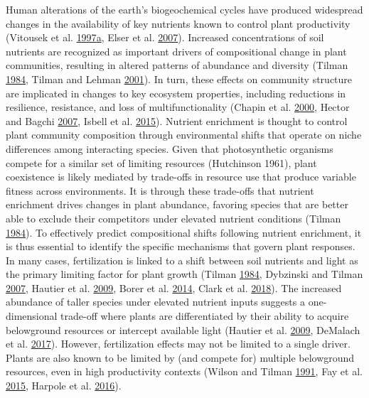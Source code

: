 \documentclass[twoside,12pt,final]{ucthesis-CA2012}
\begin{document}
\begin{ucmainmatter}
Human alterations of the earth's biogeochemical cycles have produced widespread changes in the availability of key nutrients known to control plant productivity (Vitousek et al. \protect\hyperlink{ref-Vitousek1997b}{1997}\protect\hyperlink{ref-Vitousek1997b}{a}, Elser et al. \protect\hyperlink{ref-Elser2007}{2007}).
Increased concentrations of soil nutrients are recognized as important drivers of compositional change in plant communities, resulting in altered patterns of abundance and diversity (Tilman \protect\hyperlink{ref-Tilman1984}{1984}, Tilman and Lehman \protect\hyperlink{ref-Tilman2001}{2001}).
In turn, these effects on community structure are implicated in changes to key ecosystem properties, including reductions in resilience, resistance, and loss of multifunctionality (Chapin et al. \protect\hyperlink{ref-Chapin2000}{2000}, Hector and Bagchi \protect\hyperlink{ref-Hector2007}{2007}, Isbell et al. \protect\hyperlink{ref-Isbell2015}{2015}).
Nutrient enrichment is thought to control plant community composition through environmental shifts that operate on niche differences among interacting species. Given that photosynthetic organisms compete for a similar set of limiting resources (Hutchinson 1961), plant coexistence is likely mediated by trade-offs in resource use that produce variable fitness across environments. It is through these trade-offs that nutrient enrichment drives changes in plant abundance, favoring species that are better able to exclude their competitors under elevated nutrient conditions (Tilman \protect\hyperlink{ref-Tilman1984}{1984}).
To effectively predict compositional shifts following nutrient enrichment, it is thus essential to identify the specific mechanisms that govern plant responses. In many cases, fertilization is linked to a shift between soil nutrients and light as the primary limiting factor for plant growth (Tilman \protect\hyperlink{ref-Tilman1984}{1984}, Dybzinski and Tilman \protect\hyperlink{ref-Dybzinski2007a}{2007}, Hautier et al. \protect\hyperlink{ref-Hautier2009}{2009}, Borer et al. \protect\hyperlink{ref-Borer2014a}{2014}, Clark et al. \protect\hyperlink{ref-Clark2018}{2018}).
The increased abundance of taller species under elevated nutrient inputs suggests a one-dimensional trade-off where plants are differentiated by their ability to acquire belowground resources or intercept available light (Hautier et al. \protect\hyperlink{ref-Hautier2009}{2009}, DeMalach et al. \protect\hyperlink{ref-DeMalach2017a}{2017}).
However, fertilization effects may not be limited to a single driver. Plants are also known to be limited by (and compete for) multiple belowground resources, even in high productivity contexts (Wilson and Tilman \protect\hyperlink{ref-Wilson1991}{1991}, Fay et al. \protect\hyperlink{ref-Fay2015}{2015}, Harpole et al. \protect\hyperlink{ref-Harpole2016}{2016}).

\end{ucmainmatter}
\end{document}
